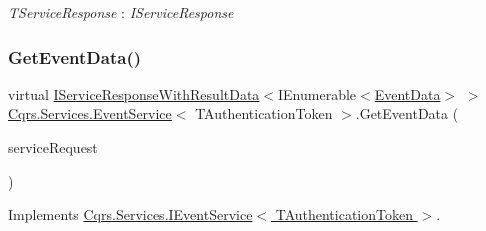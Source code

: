 \begin{Desc}
\item[Type Constraints]\begin{description}
\item[{\em T\+Service\+Response} : {\em I\+Service\+Response}]\end{description}
\end{Desc}
\mbox{\label{classCqrs_1_1Services_1_1EventService_a9a68d774ac754e39be56d3e0449f14d7_a9a68d774ac754e39be56d3e0449f14d7}} 
\subsubsection{\texorpdfstring{Get\+Event\+Data()}{GetEventData()}}
{\footnotesize\ttfamily virtual \hyperlink{interfaceCqrs_1_1Services_1_1IServiceResponseWithResultData}{I\+Service\+Response\+With\+Result\+Data}$<$I\+Enumerable$<$\hyperlink{classCqrs_1_1Events_1_1EventData}{Event\+Data}$>$ $>$ \hyperlink{classCqrs_1_1Services_1_1EventService}{Cqrs.\+Services.\+Event\+Service}$<$ T\+Authentication\+Token $>$.Get\+Event\+Data (\begin{DoxyParamCaption}\item[{\hyperlink{interfaceCqrs_1_1Services_1_1IServiceRequestWithData}{I\+Service\+Request\+With\+Data}$<$ T\+Authentication\+Token, Guid $>$}]{service\+Request }\end{DoxyParamCaption})\hspace{0.3cm}{\ttfamily [virtual]}}



Implements \hyperlink{interfaceCqrs_1_1Services_1_1IEventService_aa41b82bc398bfab0b2fd519d7f067946_aa41b82bc398bfab0b2fd519d7f067946}{Cqrs.\+Services.\+I\+Event\+Service$<$ T\+Authentication\+Token $>$}.

\mbox{\label{classCqrs_1_1Services_1_1EventService_a1556310c97fbf05df7804d53f91f8511_a1556310c97fbf05df7804d53f91f8511}} 
